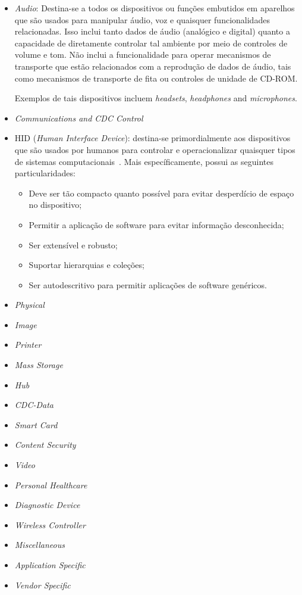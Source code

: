 \begin{itemize}
	\item \emph{Audio}: Destina-se a todos os dispositivos ou funções embutidos em aparelhos que são usados para manipular áudio, voz e quaisquer funcionalidades relacionadas. Isso inclui tanto dados de áudio (analógico e digital) quanto a capacidade de diretamente controlar tal ambiente por meio de controles de volume e tom. Não inclui a funcionalidade para operar mecanismos de transporte que estão relacionados com a reprodução de dados de áudio, tais como mecanismos de transporte de fita ou controles de unidade de CD-ROM.

	Exemplos de tais dispositivos incluem \emph{headsets}, \emph{headphones} and \emph{microphones}.
	\item \emph{Communications and CDC Control}
	\item HID (\emph{Human Interface Device}): destina-se primordialmente aos dispositivos que são usados por humanos para controlar e operacionalizar quaisquer tipos de sistemas computacionais~\cite{hid}. Mais específicamente, possui as seguintes particularidades:
	\begin{itemize}
		\item Deve ser tão compacto quanto possível para evitar desperdício de espaço no dispositivo;
		\item Permitir a aplicação de software para evitar informação desconhecida;
		\item Ser extensível e robusto;
		\item Suportar hierarquias e coleções;
		\item Ser autodescritivo para permitir aplicações de software genéricos.
	\end{itemize}
	\item \emph{Physical}
	\item \emph{Image}
	\item \emph{Printer}
	\item \emph{Mass Storage}
	\item \emph{Hub}
	\item \emph{CDC-Data}
	\item \emph{Smart Card}
	\item \emph{Content Security}
	\item \emph{Video}
	\item \emph{Personal Healthcare}
	\item \emph{Diagnostic Device}
	\item \emph{Wireless Controller}
	\item \emph{Miscellaneous}
	\item \emph{Application Specific}
	\item \emph{Vendor Specific}
\end{itemize}

